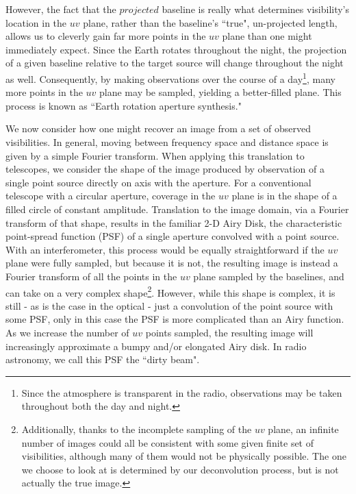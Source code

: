 However, the fact that the $projected$ baseline is really what determines visibility's location in the $uv$ plane, rather than the baseline's ``true", un-projected length, allows us to cleverly gain far more points in the $uv$ plane than one might immediately expect. Since the Earth rotates throughout the night, the projection of a given baseline relative to the target source will change throughout the night as well. Consequently, by making observations over the course of a day\footnote{Since the atmosphere is transparent in the radio, observations may be taken throughout both the day and night.}, many more points in the $uv$ plane may be sampled, yielding a better-filled plane. This process is known as ``Earth rotation aperture synthesis."

We now consider how one might recover an image from a set of observed visibilities. In general, moving between frequency space and distance space is given by a simple Fourier transform. When applying this translation to telescopes, we consider the shape of the image produced by observation of a single point source directly on axis with the aperture. For a conventional telescope with a circular aperture, coverage in the $uv$ plane is in the shape of a filled circle of constant amplitude. Translation to the image domain, via a Fourier transform of that shape, results in the familiar 2-D Airy Disk, the characteristic point-spread function (PSF) of a single aperture convolved with a point source. With an interferometer, this process would be equally straightforward if the $uv$ plane were fully sampled, but because it is not, the resulting image is instead a Fourier transform of all the points in the $uv$ plane sampled by the baselines, and can take on a very complex shape\footnote{Additionally, thanks to the incomplete sampling of the $uv$ plane, an infinite number of images could all be consistent with some given finite set of visibilities, although many of them would not be physically possible. The one we choose to look at is determined by our deconvolution process, but is not actually the true image.}. However, while this shape is complex, it is still - as is the case in the optical - just a convolution of the point source with some PSF, only in this case the PSF is more complicated than an Airy function. As we increase the number of $uv$ points sampled, the resulting image will increasingly approximate a bumpy and/or elongated Airy disk. In radio astronomy, we call this PSF the ``dirty beam".


